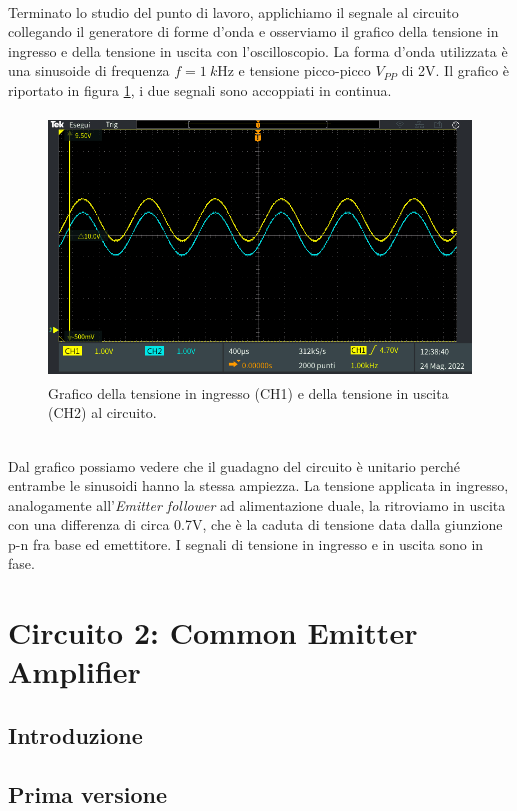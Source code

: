 \documentclass{report}
\begin{document}
\\Terminato lo studio del punto di lavoro, applichiamo il segnale al circuito collegando il generatore di forme d'onda e osserviamo il grafico della tensione in ingresso e della tensione in uscita con l'oscilloscopio. La forma d'onda utilizzata è una sinusoide di frequenza $f=\SI{1}{k\hertz}$ e tensione picco-picco $V_{PP}$ di 2V. Il grafico è riportato in figura \ref{figura:oscillo3}, i due segnali sono accoppiati in continua.
\begin{figure}[h]
\centering
\includegraphics[height=7cm]{immagini/oscillo3}
\caption{Grafico della tensione in ingresso (CH1) e della tensione in uscita (CH2) al circuito.}
\label{figura:oscillo3}
\end{figure}
\\Dal grafico possiamo vedere che il guadagno del circuito è unitario perché entrambe le sinusoidi hanno la stessa ampiezza. La tensione applicata in ingresso, analogamente all'\textit{Emitter follower} ad alimentazione duale, la ritroviamo in uscita con una differenza di circa 0.7V, che è la caduta di tensione data dalla giunzione p-n fra base ed emettitore. I segnali di tensione in ingresso e in uscita sono in fase. 
\clearpage
\newpage
\chapter{Circuito 2: Common Emitter Amplifier}
\section{Introduzione} 
\section{Prima versione} %
\end{document}
